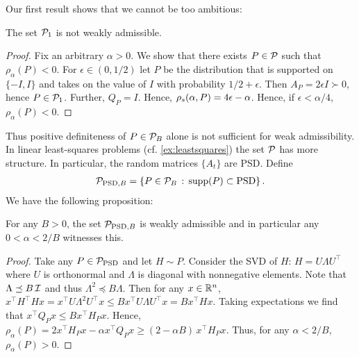 Our first result shows that we cannot be too ambitious:
\begin{proposition}\label{notwad}
The set $\P_1$ is not weakly admissible.
\end{proposition}
\begin{proof}
Fix an arbitrary $\alpha>0$. We show that there exists $P\in \P$ such that $\rho_\alpha(P)<0$.
For $\epsilon \in (0,1/2)$ let $P$ be the distribution that is supported on $\{-I,I\}$ and takes on the value of $I$ with probability $1/2+\epsilon$. Then $A_P = 2\epsilon I \succ 0$, hence $P\in \P_1$. Further, $Q_P = I$.
Hence, $\rhos{P} = 4\epsilon-\alpha$. Hence, if $\epsilon<\alpha/4$, $\rho_\alpha(P)<0$.
\end{proof}
Thus  positive definiteness of $P\in \P_B$ alone is not sufficient for weak admissibility.
In linear least-squares problems (cf. \cref{ex:leastsquares}) the set $\P$ has more structure.
In particular, the random matrices $\{A_t\}$ are PSD. 
Define
\begin{align*}
\P_{\text{PSD},B} = \{ P \in \P_B \,:\,  \supp(P)\subset \text{PSD} \}\,.
\end{align*}
We have the following proposition:
\begin{proposition}
For any $B>0$, the set $\P_{\text{PSD},B}$ is weakly admissible
and in particular any $0<\alpha < 2/B$ witnesses this.
\end{proposition}
\begin{proof}
Take any $P\in \P_{\text{PSD}}$ and let $H\sim P$.
Consider the SVD of $H$: $H = U \Lambda U^\top$ where $U$ is orthonormal and $\Lambda$ is diagonal with
nonnegative elements. Note that $\Lambda \preceq B\, \I$ and thus $\Lambda^2 \preceq B \Lambda$.
Then for any $x\in \R^n$, $x^\top H^\top H x = x^\top U \Lambda^2 U^\top x \le B x^\top U \Lambda U^\top x = B x^\top H x$.
Taking expectations we find that $x^\top Q_P x \le B x^\top H_P x$.
Hence, $\rho_\alpha(P) = 2 x^\top H_P x - \alpha x^\top Q_P x \ge (2- \alpha B ) \,x^\top H_P x $.
Thus, for any $\alpha<2/B$, $\rho_\alpha(P)>0$.
\end{proof}

